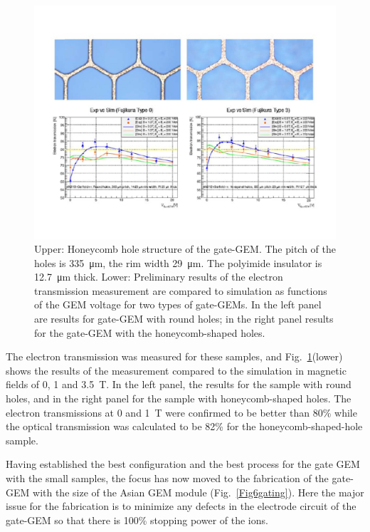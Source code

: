 \begin{figure}[htb!]
\begin{center}
\includegraphics[width=\columnwidth]{Tracker/TPC_Bonn/plots/TPC-Gate_Fig45gating.pdf}%
\caption{\label{Fig45gating} {Upper: Honeycomb hole structure of the gate-GEM.
The pitch of the holes is \SI{335}{\micro m}, the rim width \SI{29}{\micro m}.
The polyimide insulator is \SI{12.7}{\micro m} thick.
Lower: Preliminary results of the electron transmission measurement are compared to simulation
as functions of the GEM voltage for two types of gate-GEMs. In the left panel are
results for gate-GEM with round holes; in the right panel results for the gate-GEM with the honeycomb-shaped holes.}}
\end{center}
\end{figure}


The electron transmission was measured for these samples, and
Fig.~\ref{Fig45gating}(lower) shows the results of the measurement compared to the simulation in magnetic fields
of 0, 1 and \SI{3.5}{T}. In the left panel, the results for the sample with round holes, and in the right panel
for the sample with honeycomb-shaped holes.  The electron transmissions at 0 and \SI{1}{T} were confirmed
to be better than 80\% while the optical transmission was calculated to be 82\% for the honeycomb-shaped-hole sample.

Having established the best configuration and the best process for the gate GEM with the small samples,
the focus has now moved to the fabrication of the gate-GEM with  the size of the Asian GEM module (Fig.~\ref{Fig6gating}).
Here the major issue for the fabrication is to minimize any defects in the electrode circuit of the gate-GEM
so that there is 100\% stopping power of the ions.

